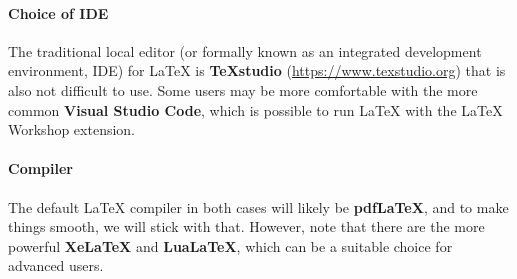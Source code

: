 \paragraph{Choice of IDE}
The traditional local editor (or formally known as an integrated development environment, IDE) for \LaTeX{} is \textbf{TeXstudio} (\href{https://www.texstudio.org}{https://\allowbreak www.texstudio.org}) that is also not difficult to use. Some users may be more comfortable with the more common \textbf{Visual Studio Code}, which is possible to run \LaTeX{} with the \LaTeX{} Workshop extension.

\paragraph{Compiler}
The default \LaTeX{} compiler in both cases will likely be \textbf{pdfLaTeX}, and to make things smooth, we will stick with that. However, note that there are the more powerful \textbf{XeLaTeX} and \textbf{LuaLaTeX}, which can be a suitable choice for advanced users.